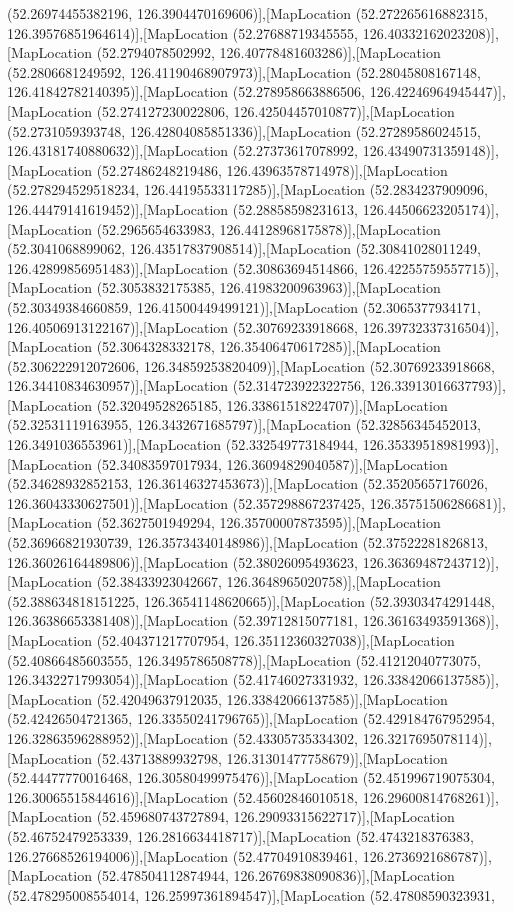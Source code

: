 (52.26974455382196, 126.3904470169606)],[MapLocation (52.272265616882315, 126.39576851964614)],[MapLocation (52.27688719345555, 126.40332162023208)],[MapLocation (52.2794078502992, 126.40778481603286)],[MapLocation (52.2806681249592, 126.41190468907973)],[MapLocation (52.28045808167148, 126.41842782140395)],[MapLocation (52.278958663886506, 126.42246964945447)],[MapLocation (52.274127230022806, 126.42504457010877)],[MapLocation (52.2731059393748, 126.42804085851336)],[MapLocation (52.27289586024515, 126.43181740880632)],[MapLocation (52.27373617078992, 126.43490731359148)],[MapLocation (52.27486248219486, 126.43963578714978)],[MapLocation (52.278294529518234, 126.44195533117285)],[MapLocation (52.2834237909096, 126.44479141619452)],[MapLocation (52.28858598231613, 126.44506623205174)],[MapLocation (52.2965654633983, 126.44128968175878)],[MapLocation (52.3041068899062, 126.43517837908514)],[MapLocation (52.30841028011249, 126.42899856951483)],[MapLocation (52.30863694514866, 126.42255759557715)],[MapLocation (52.3053832175385, 126.41983200963963)],[MapLocation (52.30349384660859, 126.41500449499121)],[MapLocation (52.3065377934171, 126.40506913122167)],[MapLocation (52.30769233918668, 126.39732337316504)],[MapLocation (52.3064328332178, 126.35406470617285)],[MapLocation (52.306222912072606, 126.34859253820409)],[MapLocation (52.30769233918668, 126.34410834630957)],[MapLocation (52.314723922322756, 126.33913016637793)],[MapLocation (52.32049528265185, 126.33861518224707)],[MapLocation (52.32531119163955, 126.3432671685797)],[MapLocation (52.32856345452013, 126.3491036553961)],[MapLocation (52.332549773184944, 126.35339518981993)],[MapLocation (52.34083597017934, 126.36094829040587)],[MapLocation (52.34628932852153, 126.36146327453673)],[MapLocation (52.35205657176026, 126.36043330627501)],[MapLocation (52.357298867237425, 126.35751506286681)],[MapLocation (52.3627501949294, 126.35700007873595)],[MapLocation (52.36966821930739, 126.35734340148986)],[MapLocation (52.37522281826813, 126.36026164489806)],[MapLocation (52.38026095493623, 126.36369487243712)],[MapLocation (52.38433923042667, 126.3648965020758)],[MapLocation (52.388634818151225, 126.36541148620665)],[MapLocation (52.39303474291448, 126.36386653381408)],[MapLocation (52.39712815077181, 126.36163493591368)],[MapLocation (52.404371217707954, 126.35112360327038)],[MapLocation (52.40866485603555, 126.3495786508778)],[MapLocation (52.41212040773075, 126.34322717993054)],[MapLocation (52.41746027331932, 126.33842066137585)],[MapLocation (52.42049637912035, 126.33842066137585)],[MapLocation (52.42426504721365, 126.33550241796765)],[MapLocation (52.429184767952954, 126.32863596288952)],[MapLocation (52.43305735334302, 126.3217695078114)],[MapLocation (52.43713889932798, 126.31301477758679)],[MapLocation (52.44477770016468, 126.30580499975476)],[MapLocation (52.451996719075304, 126.30065515844616)],[MapLocation (52.45602846010518, 126.29600814768261)],[MapLocation (52.459680743727894, 126.29093315622717)],[MapLocation (52.46752479253339, 126.2816634418717)],[MapLocation (52.4743218376383, 126.27668526194006)],[MapLocation (52.47704910839461, 126.2736921686787)],[MapLocation (52.478504112874944, 126.26769838090836)],[MapLocation (52.478295008554014, 126.25997361894547)],[MapLocation (52.47808590323931, 